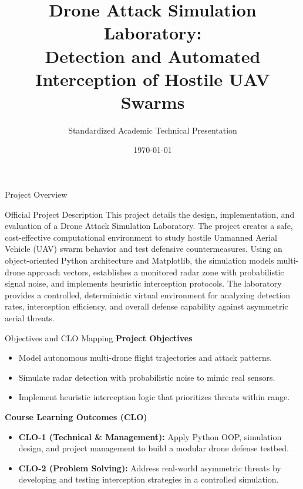 \documentclass{beamer}
\title[Drone Defense Lab]{Drone Attack Simulation Laboratory:\\Detection and Automated Interception of Hostile UAV Swarms}
\subtitle{Standardized Academic Technical Presentation}
\author{}
\institute{Advanced Simulation Engineering Group}
\date{\today}
\begin{document}
\begin{frame}
    \titlepage
\end{frame}

\begin{frame}{Project Overview}
    \begin{block}{Official Project Description}
        This project details the design, implementation, and evaluation of a Drone Attack Simulation Laboratory. The project creates a safe, cost-effective computational environment to study hostile Unmanned Aerial Vehicle (UAV) swarm behavior and test defensive countermeasures. Using an object-oriented Python architecture and Matplotlib, the simulation models multi-drone approach vectors, establishes a monitored radar zone with probabilistic signal noise, and implements heuristic interception protocols. The laboratory provides a controlled, deterministic virtual environment for analyzing detection rates, interception efficiency, and overall defense capability against asymmetric aerial threats.
    \end{block}
\end{frame}

\begin{frame}{Objectives and CLO Mapping}
    \textbf{Project Objectives}
    \begin{itemize}
        \item Model autonomous multi-drone flight trajectories and attack patterns.
        \item Simulate radar detection with probabilistic noise to mimic real sensors.
        \item Implement heuristic interception logic that prioritizes threats within range.
    \end{itemize}
    \vspace{0.3cm}
    \textbf{Course Learning Outcomes (CLO)}
    \begin{itemize}
        \item \textbf{CLO-1 (Technical \& Management):} Apply Python OOP, simulation design, and project management to build a modular drone defense testbed.
        \item \textbf{CLO-2 (Problem Solving):} Address real-world asymmetric threats by developing and testing interception strategies in a controlled simulation.
    \end{itemize}
\end{frame}
\end{document}
